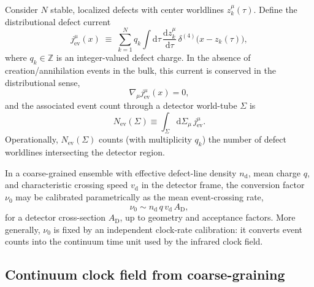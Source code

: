 \documentclass[pdflatex,sn-mathphys-num]{sn-jnl}
\theoremstyle{thmstylethree}
\theoremstyle{thmstyleone}
\theoremstyle{thmstyletwo}
\numberwithin{equation}{section}
\newcommand{\dd}{\mathrm{d}}
\begin{document}
        Consider $N$ stable, localized defects with center worldlines $z_k^\mu(\tau)$. Define the distributional defect current
        \begin{equation}
            j^\mu_{\mathrm{ev}}(x)
            \;\equiv\;
            \sum_{k=1}^{N} q_k \int \dd\tau\,
            \frac{\dd z_k^\mu}{\dd\tau}\,
            \delta^{(4)}\!\big(x-z_k(\tau)\big),
            \label{eq:defectCurrent}
        \end{equation}
        where $q_k\in\mathbb{Z}$ is an integer-valued defect charge. In the absence of creation/annihilation events in the bulk, this current is conserved in the distributional sense,
        \begin{equation}
            \nabla_\mu j^\mu_{\mathrm{ev}}(x)=0,
        \end{equation}
        and the associated event count through a detector world-tube $\Sigma$ is
        \begin{equation}
            N_{\mathrm{ev}}(\Sigma)\equiv\int_{\Sigma}\dd\Sigma_\mu\, j^\mu_{\mathrm{ev}}.
        \end{equation}
        Operationally, $N_{\mathrm{ev}}(\Sigma)$ counts (with multiplicity $q_k$) the number of defect worldlines intersecting the detector region.
        
        In a coarse-grained ensemble with effective defect-line density $n_{\mathrm d}$, mean charge $q$, and characteristic crossing speed $v_{\mathrm d}$ in the detector frame, the conversion factor $\nu_0$ may be calibrated parametrically as the mean event-crossing rate,
        \begin{equation}
            \nu_0 \sim n_{\mathrm d}\,q\,v_{\mathrm d}\,A_{\mathrm D},
            \label{eq:nu0DefectCalibration}
        \end{equation}
        for a detector cross-section $A_{\mathrm D}$, up to geometry and acceptance factors. More generally, $\nu_0$ is fixed by an independent clock-rate calibration: it converts event counts into the continuum time unit used by the infrared clock field.
    
    \subsection{Continuum clock field from coarse-graining}
        
\end{document}
